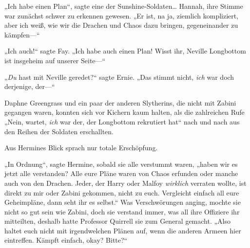 „Ich habe einen Plan“, sagte eine der Sunshine-Soldaten… Hannah, ihre Stimme war zunächst schwer zu erkennen gewesen. „Er ist, na ja, ziemlich kompliziert, aber ich weiß, wie wir die Drachen und Chaos dazu bringen, gegeneinander zu kämpfen—“

„Ich auch!“ sagte Fay. „Ich habe auch einen Plan! Wisst ihr, Neville Longbottom ist insgeheim auf unserer Seite—“

„\emph{Du} hast mit Neville geredet?“ sagte Ernie. „Das stimmt nicht, \emph{ich} war doch derjenige, der—“

Daphne Greengrass und ein paar der anderen Slytherins, die nicht mit Zabini gegangen waren, konnten sich vor Kichern kaum halten, als die zahlreichen Rufe „Nein, wartet, \emph{ich} war der, der Longbottom rekrutiert hat“ nach und nach aus den Reihen der Soldaten erschallten.

Aus Hermines Blick sprach nur totale Erschöpfung.

„In Ordnung“, sagte Hermine, sobald sie alle verstummt waren, „haben wir es jetzt alle verstanden? Alle eure Pläne waren von Chaos erfunden oder manche auch von den Drachen. Jeder, der Harry oder Malfoy \emph{wirklich} verraten wollte, ist direkt zu mir oder Zabini gekommen, nicht zu euch. Vergleicht einfach all eure Geheimpläne, dann seht ihr es selbst.“ Was Verschwörungen anging, mochte sie nicht so gut sein wie Zabini, doch sie verstand immer, was all ihre Offiziere ihr mitteilten, deshalb hatte Professor Quirrell sie zum General gemacht. „Also haltet euch nicht mit irgendwelchen Plänen auf, wenn die anderen Armeen hier eintreffen. Kämpft einfach, okay? Bitte?“

